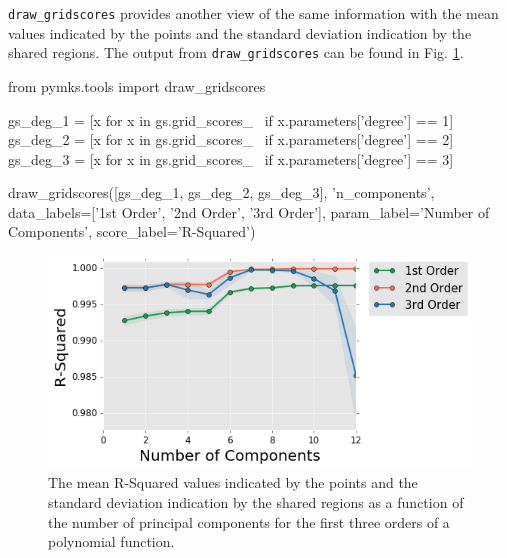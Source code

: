 \documentclass{bmcart}
\newcommand{\fimage}
{\fcolorbox{outcolor}{white}}
{}
\begin{document}
    \texttt{draw\_gridscores} provides another view of the same information
with the mean values indicated by the points and the standard deviation
indication by the shared regions. The output from \texttt{draw\_gridscores}
can be found in Fig. \ref{fig:drawGridscores}.


\begin{_input}
from pymks.tools import draw_gridscores

gs_deg_1 = [x for x in gs.grid_scores_ \
            if x.parameters['degree'] == 1]
gs_deg_2 = [x for x in gs.grid_scores_ \
            if x.parameters['degree'] == 2]
gs_deg_3 = [x for x in gs.grid_scores_ \
            if x.parameters['degree'] == 3]

draw_gridscores([gs_deg_1,  gs_deg_2, gs_deg_3], 'n_components', 
                data_labels=['1st Order',
                             '2nd Order', '3rd Order'],
                param_label='Number of Components',
                score_label='R-Squared')

\end{_input}

\begin{figure}
    \centering
    \includegraphics[scale=.625]{pymks_paper_homogenization_files/pymks_paper_homogenization_15_0.png}
    \caption{The mean R-Squared values indicated by the points and the standard deviation
indication by the shared regions as a function of the number of principal components for the first
three orders of a polynomial function.}
    \label{fig:drawGridscores}
\end{figure}

    
\end{document}
